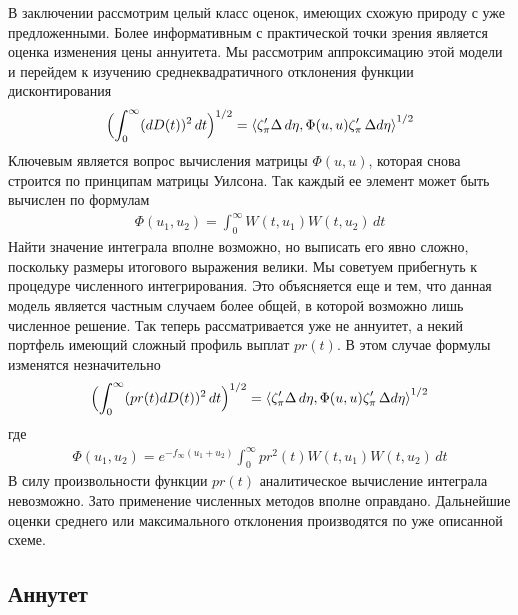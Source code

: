 \documentclass[10pt]{article}
\theoremstyle{definition}
\theoremstyle{remark}
\theoremstyle{plain}
\newcommand{\w}{f_\infty}
\newcommand{\scalar}[2]{\left<#1,#2\right>}
\begin{document}
В заключении рассмотрим целый класс оценок, имеющих схожую природу с уже предложенными. Более информативным с практической точки зрения является оценка изменения цены аннуитета. Мы рассмотрим аппроксимацию этой модели и перейдем к изучению среднеквадратичного отклонения функции дисконтирования
\begin{align}
\Bigl(\int_0^{\infty}(dD(t))^2\,dt\Bigr)^{1/2}
= \scalar{\zeta'_\pi \Delta\, d\eta}{\Phi(u,u)\zeta'_{\pi}\,\Delta d\eta}^{1/2}
\end{align}
Ключевым является вопрос вычисления матрицы $\Phi(u,u)$, которая снова строится по принципам матрицы Уилсона. Так каждый ее элемент может быть вычислен по формулам
\begin{align}
\Phi(u_1,u_2) = \int_0^{\infty} W(t,u_1) W(t,u_2) \,dt
\end{align}
Найти значение интеграла вполне возможно, но выписать его явно сложно, поскольку размеры итогового выражения велики. Мы советуем прибегнуть к процедуре численного интегрирования. Это объясняется еще и тем, что  данная модель является частным случаем более общей, в которой возможно лишь численное решение. Так теперь рассматривается уже не аннуитет, а некий портфель имеющий сложный профиль выплат $pr(t)$. В этом случае формулы изменятся незначительно
\begin{align}
\Bigl(\int_0^{\infty}(pr(t)dD(t))^2\,dt\Bigr)^{1/2}
= \scalar{\zeta'_\pi \Delta\, d\eta}{\Phi(u,u)\zeta'_{\pi}\,\Delta d\eta}^{1/2}
\end{align}
где 
\begin{align}
\Phi(u_1,u_2) = e^{-\w (u_1+u_2)}\int_0^{\infty} pr^2(t) W(t,u_1) W(t,u_2) \,dt
\end{align}
В силу произвольности функции $pr(t)$ аналитическое вычисление интеграла невозможно. Зато применение численных методов вполне оправдано. Дальнейшие оценки среднего или максимального отклонения производятся по уже описанной схеме.


\subsection{Аннутет}
\end{document}
